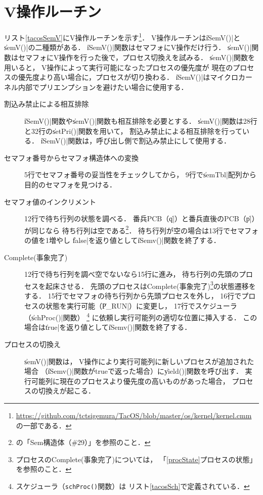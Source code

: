 \section{V操作ルーチン}
\label{tacosVOP}
リスト\ref{tacosSemV}にV操作ルーチンを示す\footnote{
  \url{https://github.com/tctsigemura/TacOS/blob/master/os/kernel/kernel.cmm}
  の一部である．}．
V操作ルーチンは\|iSemV()|と\|semV()|の二種類がある．
\|iSemV()|関数はセマフォにV操作だけ行う．
\|semV()|関数はセマフォにV操作を行った後で，プロセス切換えを試みる．
\|semV()|関数を用いると，
V操作によって実行可能になったプロセスの優先度が
現在のプロセスの優先度より高い場合に，プロセスが切り換わる．
\|iSemV()|はマイクロカーネル内部でプリエンプションを避けたい場合に使用する．



\begin{description}
\item [割込み禁止による相互排除]
  \|iSemV()|関数や\|semV()|関数も相互排除を必要とする．
  \|semV()|関数は28行と32行の\|setPri()|関数を用いて，
  割込み禁止による相互排除を行っている．
  \|iSemV()|関数は，呼び出し側で割込み禁止にして使用する．
\item [セマフォ番号からセマフォ構造体への変換]
  5行でセマフォ番号の妥当性をチェックしてから，
  9行で\|semTbl|配列から目的のセマフォを見つける．
\item [セマフォ値のインクリメント]
  12行で待ち行列の状態を調べる．
  番兵PCB（\|q|）と番兵直後のPCB（\|p|）が同じなら
  待ち行列は空である\footnote{
    の「Sem構造体（\#29）」を参照のこと．}．
  待ち行列が空の場合は13行でセマフォの値を1増やし
  \|false|を返り値として\|iSemv()|関数を終了する．
\item [Complete(事象完了)]
  12行で待ち行列を調べ空でないなら15行に進み，
  待ち行列の先頭のプロセスを起床させる．
  先頭のプロセスはComplete(事象完了)\footnote{
    プロセスのComplete(事象完了)については，
    「\ref{procState}プロセスの状態」を参照のこと．}の状態遷移をする．
  15行でセマフォの待ち行列から先頭プロセスを外し，
  16行でプロセスの状態を実行可能（\|P_RUN|）に変更し，
  17行でスケジューラ（\|schProc()|関数）
  \footnote{
    スケジューラ（\texttt{schProc()}関数）は
    リスト\ref{tacosSch}で定義されている．}
  に依頼し実行可能列の適切な位置に挿入する．
  この場合は\|true|を返り値として\|iSemv()|関数を終了する．
\item [プロセスの切換え]
  \|semV()|関数は，
  V操作により実行可能列に新しいプロセスが追加された場合
  （\|iSemv()|関数がtrueで返った場合）に\|yield()|関数を呼び出す．
  実行可能列に現在のプロセスより優先度の高いものがあった場合，
  プロセスの切換えが起こる．
\end{description}

